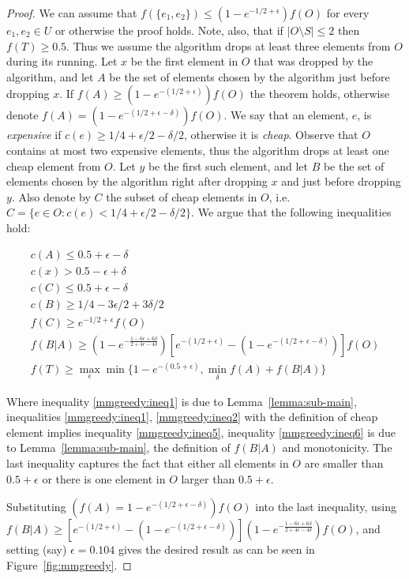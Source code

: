 \def\eps{0.104}
\begin{proof}
We can assume that $f(\{e_1, e_2\}) \leq (1 - e^{-1/2 + \epsilon})f(O)$ 
for every $e_1, e_2 \in U$ or otherwise the proof holds.
Note, also, that if $|O \setminus S| \leq 2$ then $f(T) \geq 0.5$.
Thus we assume the algorithm drops at least three elements from $O$ during its running.
Let $x$ be the first element in $O$ that was dropped by the algorithm, 
and let $A$ be the set of elements chosen by the algorithm just before dropping $x$.
If $f(A) \geq (1 - e^{-(1/2 + \epsilon)})f(O)$ the theorem holds, 
otherwise denote $f(A) = (1 - e^{-(1/2 + \epsilon - \delta)})f(O)$.
We say that an element, $e$, is \emph{expensive} if $c(e) \ge 1/4 + \epsilon/2 - \delta/2$, 
otherwise it is \emph{cheap}.
Observe that $O$ contains at most two expensive elements, thus the algorithm drops 
at least one cheap element from $O$. 
Let $y$ be the first such element, and let $B$ be the set of elements chosen by the 
algorithm right after dropping $x$ and just before dropping $y$.
Also denote by $C$ the subset of cheap elements in $O$, 
i.e. $C = \{e \in O : c(e) < 1/4 + \epsilon/2 - \delta/2\}$.
We argue that the following inequalities hold:

\begin{align}
\label{mmgreedy:ineq1}
c(A) \leq 0.5 + \epsilon - \delta 
\\
\label{mmgreedy:ineq2}
c(x) > 0.5 -\epsilon + \delta
\\
\label{mmgreedy:ineq3}
c(C) \leq 0.5 + \epsilon - \delta
\\
\label{mmgreedy:ineq5}
c(B) \ge 1/4 - 3\epsilon/2 + 3\delta/2
\\
\label{mmgreedy:ineq4}
f(C) \ge e^{-1/2 + \epsilon}f(O)
\\
\label{mmgreedy:ineq6}
f(B|A) \ge 
(1-e^{-\frac{1-6\epsilon+6\delta}{2+4\epsilon-4\delta}})
\left[
e^{-(1/2 + \epsilon)}
- (1 - e^{-(1/2 + \epsilon - \delta)})
\right]f(O)
\\
\label{mmgreedy:ineq7}
f(T) \geq \max_\epsilon \min \{1 - e^{-(0.5 + \epsilon)}, \min_{\delta} f(A) + f(B|A)\}
\end{align}

Where inequality \ref{mmgreedy:ineq1} is due to Lemma~\ref{lemma:sub-main},
inequalities \ref{mmgreedy:ineq1}, \ref{mmgreedy:ineq2} with the definition of cheap
element implies inequality \ref{mmgreedy:ineq5},
inequality \ref{mmgreedy:ineq6} is due to Lemma~\ref{lemma:sub-main}, the definition
of $f(B|A)$ and monotonicity.
The last inequality captures the fact that either all elements in $O$ are smaller than
$0.5 + \epsilon$ or there is one element in $O$ larger than $0.5 + \epsilon$.


Substituting $(f(A) = 1 - e^{-(1/2 + \epsilon - \delta)})f(O)$ into the last inequality, using $f(B|A) \ge \left[
e^{-(1/2 + \epsilon)}
- (1 - e^{-(1/2 + \epsilon - \delta)})
\right]
(1-e^{-\frac{1-6\epsilon+6\delta}{2+4\epsilon-4\delta}})f(O)$,
and setting (say) $\epsilon = \eps$ gives the desired result 
as can be seen in Figure~\ref{fig:mmgreedy}.

\end{proof}


